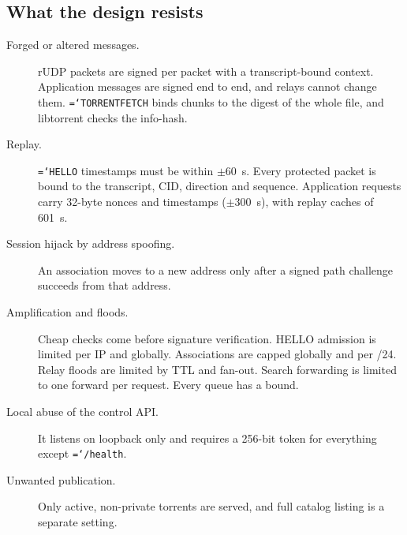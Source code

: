 \documentclass[11pt,a4paper]{article}
\newcommand{\code}[1]{\texttt{\hyphenchar\font=`\-\relax #1}}
\DeclareRobustCommand{\_}{\origunderscore\allowbreak}
\begin{document}
\subsection{What the design resists}
\begin{description}
\item[Forged or altered messages.] rUDP packets are signed per packet with a transcript-bound
  context. Application messages are signed end to end, and relays cannot change them.
  \code{TORRENT\_FETCH} binds chunks to the digest of the whole file, and libtorrent checks
  the info-hash.
\item[Replay.] \code{HELLO} timestamps must be within $\pm 60$~s. Every protected packet is
  bound to the transcript, CID, direction and sequence. Application requests carry 32-byte
  nonces and timestamps ($\pm 300$~s), with replay caches of 601~s.
\item[Session hijack by address spoofing.] An association moves to a new address only after a
  signed path challenge succeeds from that address.
\item[Amplification and floods.] Cheap checks come before signature verification. HELLO
  admission is limited per IP and globally. Associations are capped globally and per /24.
  Relay floods are limited by TTL and fan-out. Search forwarding is limited to one forward
  per request. Every queue has a bound.
\item[Local abuse of the control API.] It listens on loopback only and requires a 256-bit
  token for everything except \code{/health}.
\item[Unwanted publication.] Only active, non-private torrents are served, and full catalog
  listing is a separate setting.
\end{description}
\end{document}
